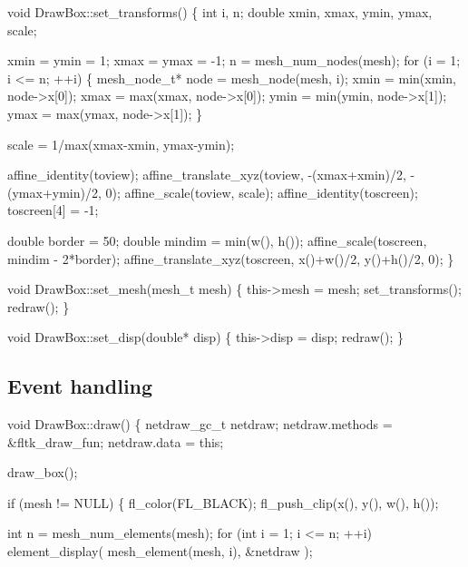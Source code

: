 \nwendcode{}\nwdocspar

\nwenddocs{}\endmoddef
void DrawBox::set_transforms()
\{
    int i, n;
    double xmin, xmax, ymin, ymax, scale;

    xmin = ymin = 1;
    xmax = ymax = -1;
    n = mesh_num_nodes(mesh);
    for (i = 1; i <= n; ++i) \{
        mesh_node_t* node = mesh_node(mesh, i);
        xmin = min(xmin, node->x[0]);
        xmax = max(xmax, node->x[0]);
        ymin = min(ymin, node->x[1]);
        ymax = max(ymax, node->x[1]);
    \}

    scale = 1/max(xmax-xmin, ymax-ymin);

    affine_identity(toview);
    affine_translate_xyz(toview, -(xmax+xmin)/2, -(ymax+ymin)/2, 0);
    affine_scale(toview, scale);
    affine_identity(toscreen);
    toscreen[4] = -1;

    double border = 50;
    double mindim = min(w(), h());
    affine_scale(toscreen, mindim - 2*border);
    affine_translate_xyz(toscreen, x()+w()/2, y()+h()/2, 0);
\}

void DrawBox::set_mesh(mesh_t mesh)
\{
    this->mesh = mesh;
    set_transforms();
    redraw();
\}

void DrawBox::set_disp(double* disp)
\{
    this->disp = disp;
    redraw();
\}

\nwendcode{}\nwdocspar


\subsection{Event handling}

\nwenddocs{}\plusendmoddef
void DrawBox::draw()
\{
    netdraw_gc_t netdraw;
    netdraw.methods = &fltk_draw_fun;
    netdraw.data    = this;

    draw_box();

    if (mesh != NULL) \{
        fl_color(FL_BLACK);
        fl_push_clip(x(), y(), w(), h());

        int n = mesh_num_elements(mesh);
        for (int i = 1; i <= n; ++i)
            element_display( mesh_element(mesh, i), &netdraw );

